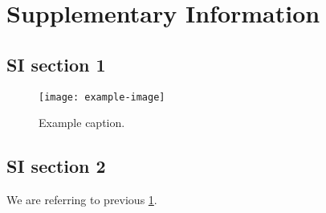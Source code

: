 
\section{Supplementary Information}

\subsection{SI section 1}

\lipsum[1]{}\citep{example}

\begin{figure}[htb]
    \centering
    \texttt{[image: example-image]}
    \caption{%
        Example caption.
    }\label{fig:caption-si}
\end{figure}

\lipsum[5]{}

\subsection{SI section 2}

We are referring to previous \cref{fig:caption-si}.

\lipsum[5]{}
